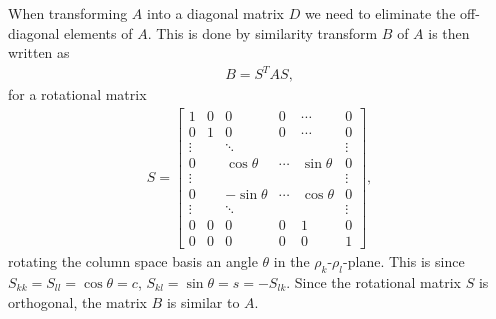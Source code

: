 \documentclass[twocolumn]{aastex62}
\begin{document}
When transforming $A$ into a diagonal matrix $D$ we need to eliminate the off-diagonal elements of $A$. This is done by similarity transform $B$ of $A$ is then written as  
\begin{align}
	B = S^T A S,
\end{align}
for a rotational matrix 
\begin{align}
S = 
	\begin{bmatrix}
		1 & 0 & 0 & 0 & \cdots & 0\\
		0 & 1 & 0 & 0 & \cdots & 0 \\	
		\vdots & & \ddots & & & \vdots \\
		0 & & \cos\theta & \cdots & \sin\theta & 0\\
		\vdots & & & & & \vdots \\
		0 & & -\sin\theta & \cdots & \cos\theta & 0\\
		\vdots & & \ddots & & & \vdots \\
		0 & 0 & 0 & 0 & 1 & 0\\		
		0 & 0 & 0 & 0 & 0 & 1
	\end{bmatrix},
\end{align}
rotating the column space basis an angle $\theta$ in the $\rho_k$-$\rho_l$-plane. This is since $S_{kk} = S_{ll} = \cos\theta = c$, $S_{kl} = \sin\theta = s = -S_{lk}$. Since the rotational matrix $S$ is orthogonal, the matrix $B$ is similar to $A$. 
\end{document}
